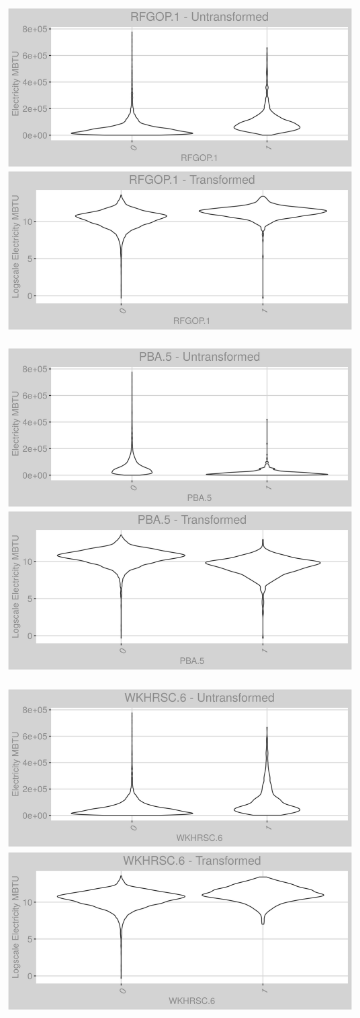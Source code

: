 \FloatBarrier
\newpage
\begin{figure}
\centering
\begin{subfigure}{1\textwidth}
\centering
\includegraphics[width=.49\textwidth, height=0.3\textheight]{Images/electricity_psf_var_original_18.png}
\includegraphics[width=.49\textwidth, height=0.3\textheight]{Images/electricity_psf_var_transformed_18.png}
\end{subfigure}
\begin{subfigure}{1\textwidth}
\centering
\includegraphics[width=.49\textwidth, height=0.3\textheight]{Images/electricity_psf_var_original_19.png}
\includegraphics[width=.49\textwidth, height=0.3\textheight]{Images/electricity_psf_var_transformed_19.png}
\end{subfigure}
\begin{subfigure}{1\textwidth}
\centering
\includegraphics[width=.49\textwidth, height=0.3\textheight]{Images/electricity_psf_var_original_20.png}
\includegraphics[width=.49\textwidth, height=0.3\textheight]{Images/electricity_psf_var_transformed_20.png}
\end{subfigure}
\end{figure}